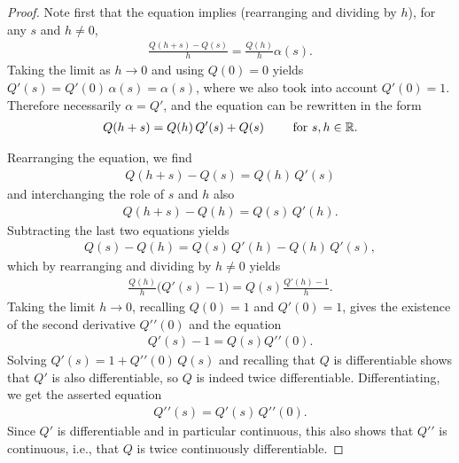 \begin{proof}
  Note first that the equation implies (rearranging and dividing by $h$),
  for any $s$ and $h \ne 0$,
  \begin{align*}
    \frac{Q(h+s) - Q(s)}{h} = \frac{Q(h)}{h} \alpha(s) .
  \end{align*}
  Taking the limit as $h \to 0$ and using $Q(0)=0$ yields
  $Q'(s) = Q'(0) \, \alpha(s) = \alpha(s)$, where we also
  took into account $Q'(0) = 1$. Therefore necessarily
  $\alpha = Q'$, and the equation can be rewritten in the form
  \begin{align*}
  Q(h+s) = Q(h) \, Q'(s) + Q(s) \qquad \text{ for } s,h \in \mathbb{R} .
  \end{align*}

  Rearranging the equation, we find
  \begin{align*}
    Q(h+s) - Q(s) = Q(h) \, Q'(s)
  \end{align*}
  and interchanging the role of $s$ and $h$ also
  \begin{align*}
    Q(h+s) - Q(h) = Q(s) \, Q'(h) .
  \end{align*}
  Subtracting the last two equations yields
  \begin{align*}
    Q(s) - Q(h) = Q(s) \, Q'(h) - Q(h) \, Q'(s) ,
  \end{align*}
  which by rearranging and dividing by $h \ne 0$ yields
  \begin{align*}
     \frac{Q(h)}{h} \big( Q'(s) - 1 \big) = Q(s) \frac{Q'(h) - 1}{h} .
  \end{align*}
  Taking the limit $h \to 0$, recalling $Q(0)=1$ and $Q'(0)=1$,
  gives the existence of the second derivative $Q' '(0)$ and the equation
  \begin{align*}
    Q'(s) - 1 = Q(s) Q' '(0) .
  \end{align*}
  Solving $Q'(s) = 1 + Q' '(0) \, Q(s)$ and recalling that $Q$
  is differentiable shows that $Q'$ is also differentiable, so
  $Q$ is indeed twice differentiable. Differentiating, we get
  the asserted equation
  \begin{align*}
    Q' '(s) = Q'(s) \, Q' '(0) .
  \end{align*}
  Since $Q'$ is differentiable and in particular continuous, this also shows
  that $Q' '$ is continuous, i.e., that $Q$ is twice continuously differentiable.
\end{proof}

